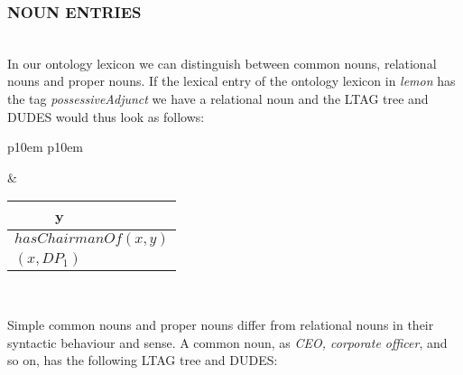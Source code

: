 \subsubsection{NOUN ENTRIES}\mbox{}\\
In our ontology lexicon we can distinguish between common nouns, relational nouns and proper nouns. If the lexical entry of the ontology lexicon in \textit{lemon} has the tag \textit{possessiveAdjunct} we have a relational noun and the LTAG tree and DUDES would thus look as follows: 

\medskip
\begin{center}
\begin{tabular}{ p{10em} p{10em} }
	\label{tbl:grammar.chairmanOf}
	
	\begin{center}
		\begin{tikzpicture}
		\Tree [.NP [.N chairman ] [.PP [.P of ] DP$_1\downarrow$ ] ]
		\end{tikzpicture}
	\end{center}
		
	&
	
	\begin{center}
		\begin{tabular}{|c|l|}
			\hline
			y & \mbox{}\\ 
			\hline
			\multicolumn{2}{|l|}{
				$hasChairmanOf(x,y)$
			} \\
			\hline
			\multicolumn{2}{|l|}{
				$(x,DP_{1})$
			} \\
			\hline
		\end{tabular}
	\end{center}	
	\\
\end{tabular}
\end{center}
\medskip

Simple common nouns and proper nouns differ from relational nouns in their syntactic behaviour and sense. A common noun, as \textit{CEO, corporate officer}, and so on, has the following LTAG tree and DUDES:


